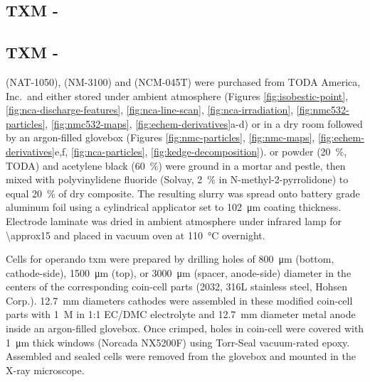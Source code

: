 \documentclass{article}
\begin{document}
\subsection{TXM - \nca{}}


\subsection{TXM - \nmc{}}

\nca{} (NAT-1050), \nmc[333]{} (NM-3100) and \nmc[532]{} (NCM-045T)
were purchased from TODA America, Inc.\ and either stored under
ambient atmosphere (Figures \ref{fig:isobestic-point},
\ref{fig:nca-discharge-features}, \ref{fig:nca-line-scan},
\ref{fig:nca-irradiation}, \ref{fig:nmc532-particles},
\ref{fig:nmc532-maps}, \ref{fig:echem-derivatives}a-d) or in a dry
room followed by an argon-filled glovebox (Figures
\ref{fig:nmc-particles}, \ref{fig:nmc-maps},
\ref{fig:echem-derivatives}e,f, \ref{fig:nca-particles},
\ref{fig:kedge-decomposition}). \nca{} or \nmc{} powder
(\SI{20}{\percent}, TODA) and acetylene black (\SI{60}{\percent}) were
ground in a mortar and pestle, then mixed with polyvinylidene fluoride
(Solvay, \SI{2}{\percent} in N-methyl-2-pyrrolidone) to equal
\SI{20}{\percent} of dry composite. The resulting slurry was spread
onto battery grade aluminum foil using a cylindrical applicator set to
\SI{102}{\micro\meter} coating thickness. Electrode laminate was dried
in ambient atmosphere under infrared lamp for \SI{\approx15}{\min} and
placed in vacuum oven at \SI{110}{\celsius} overnight.

Cells for operando \gls{txm} were prepared by drilling holes of
\SI{800}{\micro\meter} (bottom, cathode-side), \SI{1500}{\micro\meter}
(top), or \SI{3000}{\micro\meter} (spacer, anode-side) diameter in the
centers of the corresponding coin-cell parts (2032, 316L stainless
steel, Hohsen Corp.). \SI{12.7}{\milli\meter} diameters cathodes were
assembled in these modified coin-cell parts with \SI{1}{M} 
in 1:1 EC/DMC electrolyte and \SI{12.7}{\milli\meter} diameter 
metal anode inside an argon-filled glovebox. Once crimped, holes in
coin-cell were covered with \SI{1}{\micro\meter} thick 
windows (Norcada NX5200F) using Torr-Seal vacuum-rated
epoxy. Assembled and sealed cells were removed from the glovebox and
mounted in the X-ray microscope.
\end{document}
